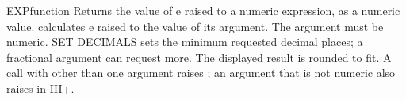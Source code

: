 \begin{XbaseEntry}{EXP}{function}
Returns the value of e raised to a numeric expression, as a numeric value.
\Syntax
{}
\Usage
{} calculates e raised to the value of its argument. The argument
must be numeric. SET DECIMALS sets the minimum requested decimal places;
a fractional argument can request more. The displayed result is rounded to fit.
A call with other than one argument raises
; an argument that is not numeric also
raises  in III+.
\Examples
{}
\end{XbaseEntry}

